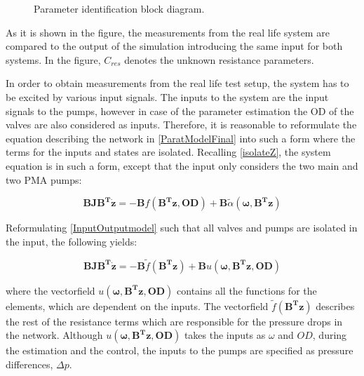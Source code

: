 \begin{figure}[H]
\centering
 
\caption{Parameter identification block diagram. }
\label{fig:parame_block}
\end{figure}

As it is shown in the figure, the measurements from the real life system are compared to the output of the simulation introducing the same input for both systems. In the figure, $C_{res}$ denotes the unknown resistance parameters.

In order to obtain measurements from the real life test setup, the system has to be excited by various input signals. The inputs to the system are the input signals to the pumps, however in case of the parameter estimation the OD of the valves are also considered as inputs. Therefore, it is reasonable to reformulate the equation describing the network in \eqref{ParatModelFinal} into such a form where the terms for the inputs and states are isolated. Recalling \eqref{isolateZ}, the system equation is in such a form, except that the input only considers the two main and two PMA pumps: 

\begin{equation}
\bm{B} \bm{J} \bm{B^T} \bm{\dot{z}} = - \bm{B} f(\bm{B^T}\bm{z}, \bm{OD}) + \bm{B}\tilde{\alpha} (\bm{\omega},\bm{B^T}\bm{z}) 
 \label{InputOutputmodel}
\end{equation}

Reformulating \eqref{InputOutputmodel} such that all valves and pumps are isolated in the input, the following yields:

\begin{equation}
\bm{B} \bm{J} \bm{B^T} \bm{\dot{z}} = - \bm{B} \tilde f(\bm{B^T}\bm{z}) + \bm{B} u(\bm{\omega},\bm{B^T}\bm{z},\bm{OD}) 
 \label{InputOutputmodel2}
\end{equation}

where the vectorfield $u(\bm{\omega},\bm{B^T}\bm{z},\bm{OD})$ contains all the functions for the elements, which are dependent on the inputs. The vectorfield $\tilde f(\bm{B^T}\bm{z})$ describes the rest of the resistance terms which are responsible for the pressure drops in the network. Although $u(\bm{\omega},\bm{B^T}\bm{z},\bm{OD})$ takes the inputs as $\omega$ and $OD$, during the estimation and the control, the inputs to the pumps are specified as pressure differences, $\Delta p$.

